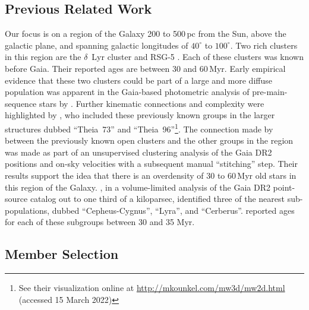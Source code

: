 \documentclass[12pt,twocolumn,tighten,linenumbers]{aastex63}
\begin{document}
\subsection{Previous Related Work}

Our focus is on a region of the Galaxy 200 to 500\,pc
from the Sun, above the galactic plane, and spanning galactic
longitudes of $40^\circ$ to $100^\circ$.  Two rich clusters in
this region are the $\delta$\ Lyr cluster
\citep{stephenson_possible_1959} and RSG-5 \citep{roser_nine_2016}.
Each of these clusters was known before Gaia.  Their reported ages are
between 30 and 60\,Myr.  Early empirical evidence that these two
clusters could be part of a large and more diffuse population was
apparent in the Gaia-based photometric analysis of pre-main-sequence
stars by \citet[][compare their Figures~11 and~13 to our
Figure~\ref{fig:XYZvtang}]{Zari2018}.  Further kinematic connections
and complexity were highlighted by \citet{KounkelCovey2019}, who
included these previously known groups in the larger structures dubbed
``Theia~73'' and ``Theia~96''\footnote{See their visualization online
at \url{http://mkounkel.com/mw3d/mw2d.html} (accessed 15 March
2022)}.
The connection made by \citet{KounkelCovey2019} between the previously
known open clusters and the other groups in the region was made as
part of an unsupervised clustering analysis of the Gaia DR2 positions
and on-sky velocities with a subsequent manual ``stitching'' step.
Their results support the idea that there is an overdensity of 30 to
60\,Myr old stars in this region of the Galaxy.  \citet{Kerr2021}, in
a volume-limited analysis of the Gaia DR2 point-source catalog out to
one third of a kiloparsec, identified three of the nearest
sub-populations, dubbed ``Cepheus-Cygnus'', ``Lyra'', and
``Cerberus''.  \citet{Kerr2021} reported ages for each of these
subgroups between 30 and 35 Myr.


\subsection{Member Selection}
\label{subsec:members}
\end{document}
